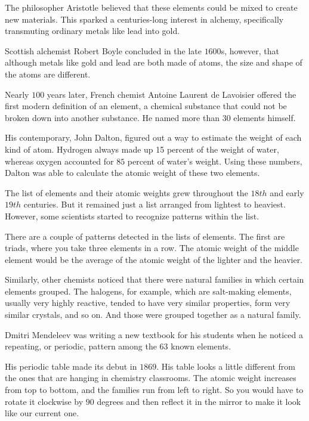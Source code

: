 The philosopher Aristotle believed that these elements could be
mixed to create new materials. This sparked a centuries-long interest in
alchemy, specifically transmuting ordinary metals like lead into gold.

Scottish alchemist Robert Boyle concluded in the late $1600$s, however, that
although metals like gold and lead are both made of atoms, the size and shape of
the atoms are different.

Nearly $100$ years later, French chemist Antoine Laurent de Lavoisier offered the
first modern definition of an element, a chemical substance that could not be
broken down into another substance. He named more than $30$ elements himself.

His contemporary, John Dalton, figured out a way to estimate the weight of each
kind of atom. Hydrogen always made up 15 percent of the weight of water, whereas
oxygen accounted for $85$ percent of water's weight. Using these numbers, Dalton
was able to calculate the atomic weight of these two elements.

The list of elements and their atomic weights grew throughout the $18th$ and early
$19th$ centuries. But it remained just a list arranged from lightest to heaviest.
However, some scientists started to recognize patterns within the list.

There are a couple of patterns detected in the lists of elements. The first are
triads, where you take three elements in a row. The atomic weight of the middle
element would be the average of the atomic weight of the lighter and the
heavier.

Similarly, other chemists noticed that there were natural families in which
certain elements grouped. The halogens, for example, which are salt-making
elements, usually very highly reactive, tended to have very similar properties,
form very similar crystals, and so on. And those were grouped together as a
natural family.

Dmitri Mendeleev was writing a new textbook for his students when he noticed a
repeating, or periodic, pattern among the $63$ known elements.

His periodic table made its debut in $1869$. His table looks a little different
from the ones that are hanging in chemistry classrooms. The atomic weight
increases from top to bottom, and the families run from left to right. So you
would have to rotate it clockwise by $90$ degrees and then reflect it in the
mirror to make it look like our current one.

